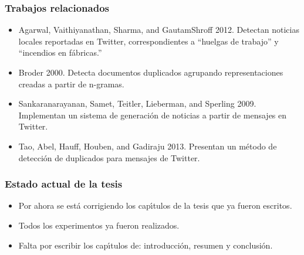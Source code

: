 \documentclass{beamer}
\begin{document}
\begin{frame}
  \frametitle{Trabajos relacionados}
  \begin{itemize}
  \item Agarwal, Vaithiyanathan, Sharma, and GautamShroff 2012. Detectan noticias locales reportadas en Twitter, correspondientes a ``huelgas de trabajo'' y ``incendios en f\'{a}bricas.''\\
    \vspace{2mm}
  \item Broder 2000. Detecta documentos duplicados agrupando representaciones creadas a partir de n-gramas.\\
    \vspace{2mm}
  \item Sankaranarayanan, Samet, Teitler, Lieberman, and Sperling 2009. Implementan un sistema de generaci\'{o}n de noticias a partir de mensajes en Twitter.\\
    \vspace{2mm}
  \item Tao, Abel, Hauff, Houben, and Gadiraju 2013. Presentan un m\'{e}todo de detecci\'{o}n de duplicados para mensajes de Twitter.
  \end{itemize}
\end{frame}

\begin{frame}
  \frametitle{Estado actual de la tesis}
  \begin{itemize}
  \item Por ahora se est\'{a} corrigiendo los cap\'{\i}tulos de la tesis que ya fueron escritos.
    \vspace{2mm}
  \item Todos los experimentos ya fueron realizados.
    \vspace{2mm}
  \item Falta por escribir los cap\'{\i}tulos de: introducci\'{o}n, resumen y conclusi\'{o}n.
  \end{itemize}
\end{frame}
\end{document}
